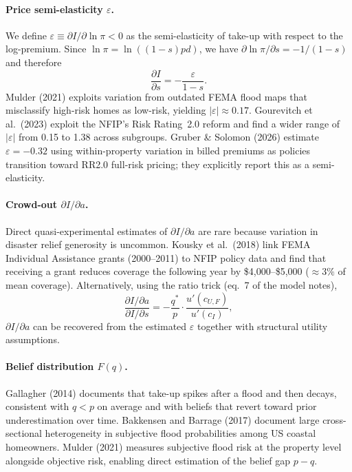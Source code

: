 \documentclass[12pt]{article}
\begin{document}
\paragraph{Price semi-elasticity $\varepsilon$.}
We define $\varepsilon \equiv \partial I/\partial\ln\pi < 0$ as the semi-elasticity of take-up with respect to the log-premium. Since $\ln\pi = \ln((1-s)pd)$, we have $\partial\ln\pi/\partial s = -1/(1-s)$ and therefore
\[
    \frac{\partial I}{\partial s} = -\frac{\varepsilon}{1-s}.
\]
Mulder (2021) exploits variation from outdated FEMA flood maps that misclassify high-risk homes as low-risk, yielding $|\varepsilon| \approx 0.17$.
Gourevitch et al.\ (2023) exploit the NFIP's Risk Rating~2.0 reform and find a wider range of $|\varepsilon|$ from 0.15 to 1.38 across subgroups.
Gruber \& Solomon (2026) estimate $\varepsilon = -0.32$ using within-property variation in billed premiums as policies transition toward RR2.0 full-risk pricing; they explicitly report this as a semi-elasticity.

\paragraph{Crowd-out $\partial I / \partial a$.}
Direct quasi-experimental estimates of $\partial I/\partial a$ are rare because variation in disaster relief generosity is uncommon.
Kousky et al.\ (2018) link FEMA Individual Assistance grants (2000--2011) to NFIP policy data and find that receiving a grant reduces coverage the following year by \$4{,}000--\$5{,}000 ($\approx 3\%$ of mean coverage).
Alternatively, using the ratio trick (eq.~7 of the model notes),
\[
    \frac{\partial I/\partial a}{\partial I/\partial s} = -\frac{q^*}{p}\cdot\frac{u'(c_{U,F})}{u'(c_I)},
\]
$\partial I/\partial a$ can be recovered from the estimated $\varepsilon$ together with structural utility assumptions.

\paragraph{Belief distribution $F(q)$.}
Gallagher (2014) documents that take-up spikes after a flood and then decays, consistent with $q < p$ on average and with beliefs that revert toward prior underestimation over time.
Bakkensen and Barrage (2017) document large cross-sectional heterogeneity in subjective flood probabilities among US coastal homeowners.
Mulder (2021) measures subjective flood risk at the property level alongside objective risk, enabling direct estimation of the belief gap $p - q$.
\end{document}

